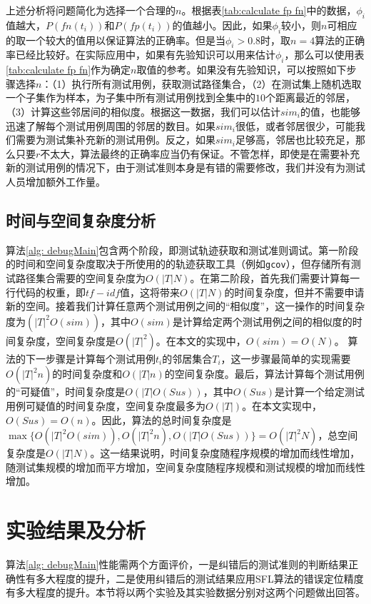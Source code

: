上述分析将问题简化为选择一个合理的$n$。根据表\ref{tab:calculate fp fn}中的数据，$\phi_i$值越大，$P(fn(t_i))$和$P(fp(t_i))$的值越小。因此，如果$\phi_i$较小，则$n$可相应的取一个较大的值用以保证算法的正确率。但是当$\phi_i > 0.8$时，取$n = 4$算法的正确率已经比较好。在实际应用中，如果有先验知识可以用来估计$\phi_i$，那么可以使用表\ref{tab:calculate fp fn}作为确定$n$取值的参考。如果没有先验知识，可以按照如下步骤选择$n$：（1）执行所有测试用例，获取测试路径集合，（2）在测试集上随机选取一个子集作为样本，为子集中所有测试用例找到全集中的$10$个距离最近的邻居，（3）计算这些邻居间的相似度。根据这一数据，我们可以估计$sim_i$的值，也能够迅速了解每个测试用例周围的邻居的数目。如果$sim_i$很低，或者邻居很少，可能我们需要为测试集补充新的测试用例。反之，如果$sim_i$足够高，邻居也比较充足，那么只要$r$不太大，算法最终的正确率应当仍有保证。不管怎样，即使是在需要补充新的测试用例的情况下，由于测试准则本身是有错的需要修改，我们并没有为测试人员增加额外工作量。

\subsection{时间与空间复杂度分析}

算法\ref{alg: debugMain}包含两个阶段，即测试轨迹获取和测试准则调试。第一阶段的时间和空间复杂度取决于所使用的的轨迹获取工具（例如\texttt{gcov}），但存储所有测试路径集合需要的空间复杂度为$O(|T|N)$。在第二阶段，首先我们需要计算每一行代码的权重，即$tf-idf$值，这将带来$O(|T|N)$的时间复杂度，但并不需要申请新的空间。接着我们计算任意两个测试用例之间的“相似度”，这一操作的时间复杂度为$({|T|}^2 O(sim))$，其中$O(sim)$是计算给定两个测试用例之间的相似度的时间复杂度，空间复杂度是$O({|T|}^2)$。在本文的实现中，$O(sim) = O(N)$。
算法的下一步骤是计算每个测试用例$t_i$的邻居集合$T_i$，这一步骤最简单的实现需要$O({|T|}^2 n)$的时间复杂度和$O(|T| n)$的空间复杂度。最后，算法计算每个测试用例的“可疑值”，时间复杂度是$O(|T| O(Sus))$，其中$O(Sus)$是计算一个给定测试用例可疑值的时间复杂度，空间复杂度最多为$O(|T|)$。在本文实现中，$O(Sus) = O(n)$。因此，算法的总时间复杂度是$\max\{O({|T|}^2 O(sim)), O({|T|}^2 n), O(|T| O(Sus))\} = O({|T|}^2 N)$，总空间复杂度是$O(|T| N)$。这一结果说明，时间复杂度随程序规模的增加而线性增加，随测试集规模的增加而平方增加，空间复杂度随程序规模和测试规模的增加而线性增加。

\section{实验结果及分析}
\label{sec: experiments}
算法\ref{alg: debugMain}性能需两个方面评价，一是纠错后的测试准则的判断结果正确性有多大程度的提升，二是使用纠错后的测试结果应用SFL算法的错误定位精度有多大程度的提升。本节将以两个实验及其实验数据分别对这两个问题做出回答。

